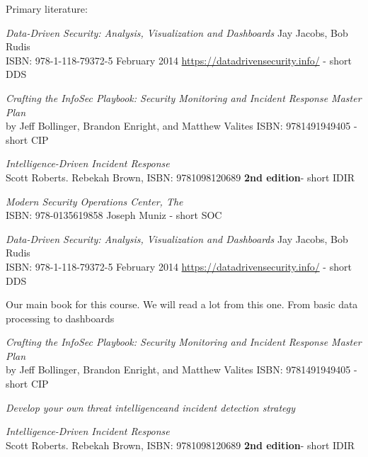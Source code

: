 \documentclass[Screen16to9,17pt]{foils}
\begin{document}
Primary literature:
\begin{list2}
\item \emph{Data-Driven Security: Analysis, Visualization and Dashboards} Jay Jacobs, Bob Rudis\\
ISBN: 978-1-118-79372-5 February 2014 \url{https://datadrivensecurity.info/} - short DDS
\item \emph{Crafting the InfoSec Playbook: Security Monitoring and Incident Response Master Plan}\\
 by Jeff Bollinger, Brandon Enright, and Matthew Valites ISBN: 9781491949405 - short CIP
\item \emph{Intelligence-Driven Incident Response} \\
 Scott Roberts. Rebekah Brown, ISBN: 9781098120689 {\bf 2nd edition}- short IDIR

\item \emph{Modern Security Operations Center, The}\\
ISBN: 978-0135619858 Joseph Muniz - short SOC
\end{list2}



\emph{Data-Driven Security: Analysis, Visualization and Dashboards} Jay Jacobs, Bob Rudis\\
ISBN: 978-1-118-79372-5 February 2014 \url{https://datadrivensecurity.info/} - short DDS

Our main book for this course. We will read a lot from this one. From basic data processing to dashboards



\emph{Crafting the InfoSec Playbook: Security Monitoring and Incident Response Master Plan}\\
 by Jeff Bollinger, Brandon Enright, and Matthew Valites ISBN: 9781491949405 - short CIP

\emph{Develop your own threat intelligenceand incident detection strategy}



\emph{Intelligence-Driven Incident Response} \\
  Scott Roberts. Rebekah Brown, ISBN: 9781098120689 {\bf 2nd edition}- short IDIR
\end{document}
